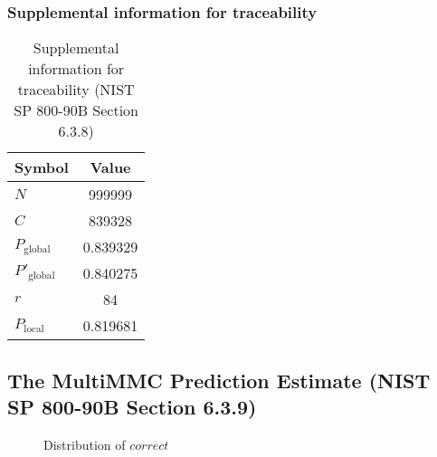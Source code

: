 \documentclass[a3paper,xelatex,english]{bxjsarticle}
\begin{document}
\subsubsection{Supplemental information for traceability}
\renewcommand{\arraystretch}{1.8}
\begin{table}[h]
\caption{Supplemental information for traceability (NIST SP 800-90B Section 6.3.8)}
\begin{center}
\begin{tabular}{|l|c|}
\hline 
\rowcolor{anotherlightblue} %
Symbol				& Value \\ \hline 
$N$				& 999999\\ \hline 
$C$				& 839328\\ \hline 
$P_{\textrm{global}}$				& 0.839329\\ \hline 
$P'_{\textrm{global}}$			& 0.840275\\ \hline 
$r$				& 84\\ \hline 
$P_{\textrm{local}}$ 			& 0.819681\\ \hline
\end{tabular}
\end{center}
\end{table}
\renewcommand{\arraystretch}{1.4}
\clearpage
\subsection{The MultiMMC Prediction Estimate (NIST SP 800-90B Section 6.3.9)}\label{sec:Binary639}

\begin{figure}[htbp]
\centering

\caption{Distribution of $correct$}
\end{figure}
\end{document}
